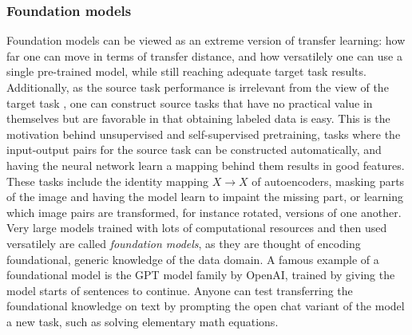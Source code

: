 \documentclass{article}
\begin{document}
\subsubsection{Foundation models}

Foundation models can be viewed as an extreme version of transfer learning: how far one can 
move in terms of transfer distance, and how versatilely one can use a single pre-trained model, 
while still reaching adequate target task results. Additionally, as the source task 
performance is irrelevant from the view of the target task \cite{transferlearning_survey}, one can construct source tasks 
that have no practical value in themselves but are favorable in that obtaining labeled data 
is easy. This is the motivation behind unsupervised and self-supervised pretraining,
tasks where the input-output pairs for the source task can be constructed automatically, and having the 
neural network learn a mapping behind them results in good features. These tasks include the identity 
mapping $X\to X$ of autoencoders, masking parts of the image and having the model learn to
impaint the missing part, or learning which image pairs are transformed, for instance rotated,
versions of one another. Very large models trained with lots of computational resources 
and then used versatilely are called \textit{foundation models}, as they are thought of 
encoding foundational, generic knowledge of the data domain. A famous example of 
a foundational model is the GPT model family by OpenAI, trained 
by giving the model starts of sentences to continue. 
Anyone can test transferring the foundational knowledge on text by prompting the open chat variant of the model a new task, 
such as solving elementary math equations.
\end{document}

